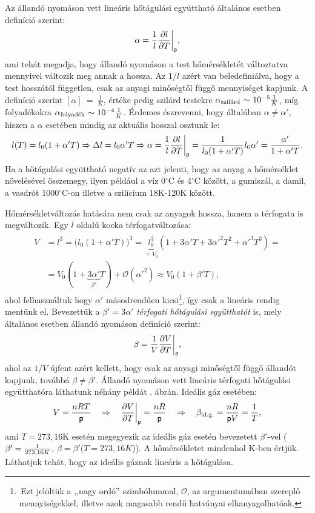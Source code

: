     \FloatBarrier
Az állandó nyomáson vett lineáris hőtágulási együttható általános esetben definíció szerint:
\begin{align}
    \alpha = \frac{1}{l} \frac{\partial{l}}{\partial{T}}\bigg|_\mathsf p,
\end{align}
ami tehát megadja, hogy állandó nyomáson a test hőmérsékletét változtatva mennyivel változik meg annak a hossza. Az $1/l$ azért van beledefiniálva, hogy a test hosszától független, csak az anyagi minőségtől függő mennyiséget kapjunk. A definíció szerint $[\alpha]~{=}~\frac 1K$, értéke pedig szilárd testekre $\alpha_{\textnormal{szilárd}}~{\sim}~10^{-5} \frac 1K$, míg folyadékokra $\alpha_{\textnormal{folyadék}}~{\sim}~10^{-4} \frac 1K$. Érdemes észrevenni, hogy általában $\alpha\neq\alpha'$, hiszen a $\alpha$ esetében mindig az aktuális hosszal osztunk le:
\begin{align}
    l(T) = l_0(1+\alpha' T)\Rightarrow \Delta l = l_0\alpha' T \Rightarrow \alpha = \frac{1}{l} \frac{\partial{l}}{\partial{T}}\bigg|_\mathsf p = \frac{1}{l_0(1+\alpha' T)}l_0\alpha' = \frac{\alpha'}{1+\alpha' T}.
\end{align}
Ha a hőtágulási együttható negatív az azt jelenti, hogy az anyag a hőmérséklet növelésével összemegy, ilyen például a víz 0$^\circ$C és 4$^\circ$C között, a gumiszál, a damil, a vasdrót 1000$^\circ$C-on illetve a szilícium 18K-120K között.

Hőmérsékletváltozás hatására nem csak az anyagok hossza, hanem a térfogata is megváltozik. Egy $l$ oldalú kocka térfogatváltozása:
\begin{align}
\begin{split}
    V &= l^3 = \big(l_0(1+\alpha' T) \big)^3 = \underbrace{l_0^3}_{=V_0}(1+3\alpha' T +3{\alpha'}^2 T^2 + {\alpha'}^3 T^3) =\\
    &=V_0(1+\underbrace{3\alpha'}_{\beta'} T) + \mathcal O({\alpha'}^2) \approx V_0(1+\beta' T),
\end{split}
\end{align}
ahol felhasználtuk hogy $\alpha'$ másodrendűen kicsi\footnote{\,Ezt jelöltük a ,,nagy ordó'' szimbólummal, $\mathcal O$, az argumentumában szereplő mennyiségekkel, illetve azok magasabb rendű hatványai elhanyagolhatóak.}, így csak a lineáris rendig mentünk el. Bevezettük a $\beta' = 3\alpha'$ \emph{térfogati hőtágulási együtthatót} is, mely általános esetben állandó nyomáson definíció szerint:
\begin{align}
    \beta = \frac{1}{V} \frac{\partial{V}}{\partial{T}}\bigg|_\mathsf p,
\end{align}
ahol az $1/V$ újfent azért kellett, hogy csak az anyagi minőségtől függő állandót kapjunk, továbbá $\beta\neq\beta'$. Állandó nyomáson vett lineáris térfogati hőtágulási együtthatóra láthatunk néhány példát . ábrán. Ideális gáz esetében:
\begin{align}
    V = \frac{nRT}{\mathsf p} \quad\Rightarrow\quad \frac{\partial{V}}{\partial{T}}\bigg|_\mathsf p = \frac{nR}{\mathsf p} \quad\Rightarrow\quad \beta_{\textnormal{id.g.}} = \frac{nR}{\mathsf p V}=\frac{1}{T},
\end{align}
ami $T = 273{,}16$K esetén megegyezik az ideális gáz esetén bevezetett $\beta'$-vel ($\beta' = \frac{1}{273{,}16K}$, $\beta=\beta'(T{=}273{,}16K$)). A hőmérsékletet mindenhol K-ben értjük. Láthatjuk tehát, hogy az ideális gáznak lineáris a hőtágulása.

